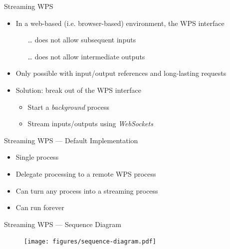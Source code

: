 \documentclass[xcolor=svgnames,professionalfonts,11pt,aspectratio=43]{beamer}
\begin{document}
\begin{frame}[t]{Streaming WPS}
  \begin{itemize}
    \item In a web-based (i.e. browser-based) environment, the WPS interface
    \begin{itemize}
      \item[\dots] does not allow subsequent inputs
      \item[\dots] does not allow intermediate outputs
    \end{itemize}
    \pause
    \item Only possible with input/output references and long-lasting requests
    \pause
    \item Solution: break out of the WPS interface
    \begin{itemize}
      \item Start a \emph{background} process
      \item Stream inputs/outputs using \emph{WebSockets}
    \end{itemize}
  \end{itemize}
\end{frame}

\begin{frame}[t]{Streaming WPS --- Default Implementation}
  \begin{itemize}
    \item Single process
    \pause
    \item Delegate processing to a remote WPS process
    \pause
    \item Can turn any process into a streaming process
    \pause
    \item Can run forever
  \end{itemize}
\end{frame}

\begin{frame}[c,fragile]{Streaming WPS --- Sequence Diagram}
  \begin{figure}
    \begin{center}
      \texttt{[image: figures/sequence-diagram.pdf]}
    \end{center}
  \end{figure}
\end{frame}
\end{document}
